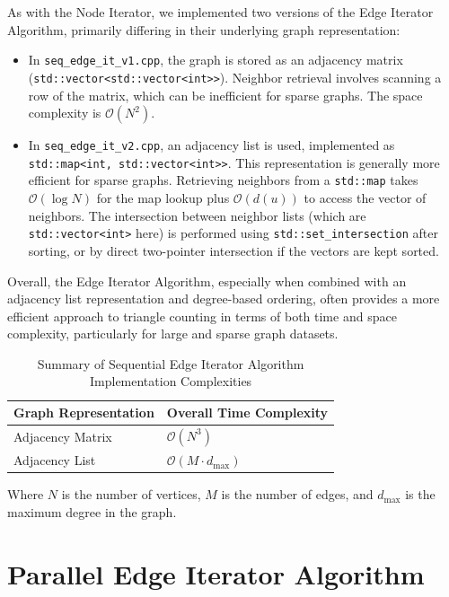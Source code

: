 \documentclass{aes2e}
\begin{document}
As with the Node Iterator, we implemented two versions of the Edge Iterator Algorithm, primarily differing in their underlying graph representation:

\begin{itemize}
    \item In \texttt{seq\_edge\_it\_v1.cpp}, the graph is stored as an adjacency matrix (\texttt{std::vector<std::vector<int>>}). Neighbor retrieval involves scanning a row of the matrix, which can be inefficient for sparse graphs. The space complexity is $\mathcal{O}(N^2)$.
    \item In \texttt{seq\_edge\_it\_v2.cpp}, an adjacency list is used, implemented as \texttt{std::map<int, std::vector<int>>}. This representation is generally more efficient for sparse graphs. Retrieving neighbors from a \texttt{std::map} takes $\mathcal{O}(\log N)$ for the map lookup plus $\mathcal{O}(d(u))$ to access the vector of neighbors. The intersection between neighbor lists (which are \texttt{std::vector<int>} here) is performed using \texttt{std::set\_intersection} after sorting, or by direct two-pointer intersection if the vectors are kept sorted.
\end{itemize}

Overall, the Edge Iterator Algorithm, especially when combined with an adjacency list representation and degree-based ordering, often provides a more efficient approach to triangle counting in terms of both time and space complexity, particularly for large and sparse graph datasets.

\begin{table}[htbp]
    \centering
    \caption{Summary of Sequential Edge Iterator Algorithm Implementation Complexities}
    \label{tab:edge_complexity_summary}
    \begin{tabular}{|l|l|}
        \hline
        \textbf{Graph Representation} & \textbf{Overall Time Complexity} \\
        \hline
        Adjacency Matrix & $\mathcal{O}(N^3)$ \\
        Adjacency List & $\mathcal{O}(M \cdot d_{\text{max}})$ \\
        \hline
    \end{tabular}
    \vspace{0.5em}
    \small
    Where $N$ is the number of vertices, $M$ is the number of edges, and $d_{\text{max}}$ is the maximum degree in the graph.
\end{table}


\section{Parallel Edge Iterator Algorithm}
\end{document}
